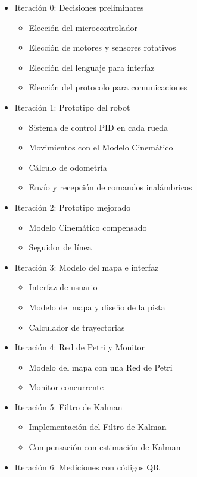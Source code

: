 \begin{itemize}
    \item Iteración 0: Decisiones preliminares
    \begin{itemize}
        \item Elección del microcontrolador
        \item Elección de motores y sensores rotativos
        \item Elección del lenguaje para interfaz
        \item Elección del protocolo para comunicaciones
    \end{itemize}

    \item Iteración 1: Prototipo del robot
    \begin{itemize}
        \item Sistema de control PID en cada rueda
        \item Movimientos con el Modelo Cinemático
        \item Cálculo de odometría
        \item Envío y recepción de comandos inalámbricos
    \end{itemize}

    \item Iteración 2: Prototipo mejorado
    \begin{itemize}
        \item Modelo Cinemático compensado
        \item Seguidor de línea
    \end{itemize}

    \item Iteración 3: Modelo del mapa e interfaz
    \begin{itemize}
        \item Interfaz de usuario
        \item Modelo del mapa y diseño de la pista
        \item Calculador de trayectorias
    \end{itemize}

    \item Iteración 4: Red de Petri y Monitor
    \begin{itemize}
        \item Modelo del mapa con una Red de Petri
        \item Monitor concurrente
    \end{itemize}

    \item Iteración 5: Filtro de Kalman
    \begin{itemize}
        \item Implementación del Filtro de Kalman
        \item Compensación con estimación de Kalman
    \end{itemize}

    \item Iteración 6: Mediciones con códigos QR
\end{itemize}


